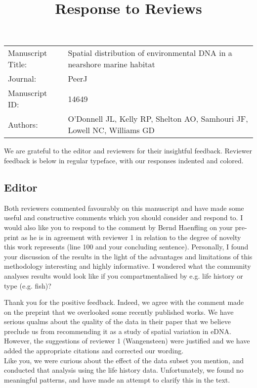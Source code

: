 \documentclass{article}
\newenvironment{response}
	{
	\begin{adjustwidth}{1cm}{0cm}
	\color{peerjBlue}
	}
	{
	\end{adjustwidth}
	}
\begin{document}
\title{Response to Reviews}

\maketitle


\begin{tabular}{ l l }
Manuscript Title: &
Spatial distribution of environmental DNA in a nearshore marine habitat
\\
Journal: &
PeerJ
\\
Manuscript ID: &
14649
\\
Authors: &
O'Donnell JL,
Kelly RP,
Shelton AO,
Samhouri JF,
Lowell NC,
Williams GD
\\
\end{tabular}

\bigskip

We are grateful to the editor and reviewers for their insightful feedback.
Reviewer feedback is below in regular typeface, with our responses indented and colored.

\subsection*{Editor}
Both reviewers commented favourably on this manuscript and have made some useful and constructive comments which you should consider and respond to. I would also like you to respond to the comment by Bernd Haenfling on your pre-print as he is in agreement with reviewer 1 in relation to the degree of novelty this work represents (line 100 and your concluding sentence). Personally, I found your discussion of the results in the light of the advantages and limitations of this methodology interesting and highly informative. I wondered what the community analyses results would look like if you compartmentalised by e.g. life history or type (e.g. fish)?

\begin{response}
  Thank you for the positive feedback.
	Indeed, we agree with the comment made on the preprint that we overlooked some recently published works.
	We have serious qualms about the quality of the data in their paper that we believe preclude us from recommending it as a study of spatial variation in eDNA.
	However, the suggestions of reviewer 1 (Wangensteen) were justified and we have added the appropriate citations and corrected our wording.
	\\

	Like you, we were curious about the effect of the data subset you mention, and conducted that analysis using the life history data. Unfortunately, we found no meaningful patterns, and have made an attempt to clarify this in the text.
	\\
\end{response}
\end{document}
